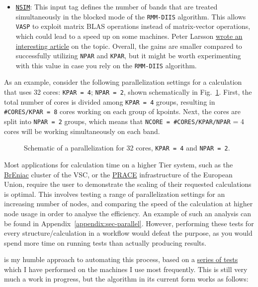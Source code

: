 \begin{refsection}
\begin{itemize}
\item \href{https://cms.mpi.univie.ac.at/wiki/index.php/NSIM}{\texttt{NSIM}}: This input tag defines the number of bands that are treated simultaneously in the blocked mode of the \texttt{RMM-DIIS} algorithm. This allows \texttt{VASP} to exploit matrix BLAS operations instead of matrix-vector operations, which could lead to a speed up on some machines. Peter Larsson \href{https://www.nsc.liu.se/~pla/blog/2012/02/22/nparnsim/}{wrote an interesting article} on the topic. Overall, the gains are smaller compared to successfully utilizing \verb|NPAR| and \verb|KPAR|, but it might be worth experimenting with this value in case you rely on the \texttt{RMM-DIIS} algorithm.

\end{itemize}

As an example, consider the following parallelization settings for a calculation that uses 32 cores: \texttt{KPAR = 4}; \texttt{NPAR = 2}, shown schematically in Fig.~\ref{automation:fig-parallel}. First, the total number of cores is divided among \texttt{KPAR = 4} groups, resulting in \texttt{\#CORES/KPAR = 8} cores working on each group of kpoints. Next, the cores are split into \texttt{NPAR = 2} groups, which means that \texttt{NCORE = \#CORES/KPAR/NPAR} = 4 cores will be working simultaneously on each band.

\begin{figure}[hb]
\centering

\caption{Schematic of a parallelization for 32 cores, \texttt{KPAR = 4}  and \texttt{NPAR = 2}.}
\label{automation:fig-parallel}
\end{figure}

Most applications for calculation time on a higher Tier system, such as the \href{https://www.vscentrum.be/tier1}{BrEniac} cluster of the VSC, or the \href{http://www.prace-ri.eu/}{PRACE} infrastructure of the European Union, require the user to demonstrate the scaling of their requested calculations is optimal. This involves testing a range of parallelization settings for an increasing number of nodes, and comparing the speed of the calculation at higher node usage in order to analyse the efficiency. An example of such an analysis can be found in Appendix~\ref{appendix:sec-parallel}. However, performing these tests for every structure/calculation in a workflow would defeat the purpose, as you would spend more time on running tests than actually producing results. 

 is my humble approach to automating this process, based on a \href{https://mybinder.org/v2/gh/mbercx/jupyter/master?filepath=parallel\%2Fparallel_analysis.ipynb}{series of tests} which I have performed on the machines I use most frequently. This is still very much a work in progress, but the algorithm in its current form works as follows:


\end{refsection}
